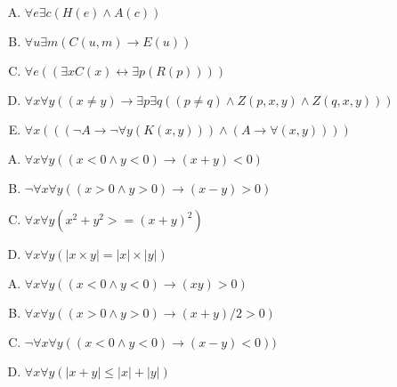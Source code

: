 {{        %
        \begin{practices}
            \begin{enumerate}[A.]
                \item $\forall e \exists c (H(e) \wedge A(c))$
                \item $\forall u \exists m (C(u, m) \rightarrow E(u))$
                \item $\forall e ((\exists x C(x) \leftrightarrow \exists p (R(p))))$
                \item $\forall x \forall y ((x \neq y) \rightarrow \exists p \exists q ((p \neq q) \wedge Z(p, x, y) \wedge Z(q, x, y)))$
                \item $\forall x (((\neg A \rightarrow \neg \forall y (K(x, y))) \wedge (A \rightarrow \forall (x, y))))$
            \end{enumerate}
        \end{practices}

        \begin{practices}
            \begin{enumerate}[A.]
                \item $\forall x \forall y ((x < 0 \wedge y < 0) \rightarrow (x + y) < 0)$
                \item $\neg \forall x \forall y ((x > 0 \wedge y > 0) \rightarrow (x - y) > 0)$
                \item $\forall x \forall y (x^2 + y^2 >= (x + y)^2)$
                \item $\forall x \forall y (|x \times y| = |x| \times |y|)$
            \end{enumerate}
        \end{practices}

        \begin{practices}
            \begin{enumerate}[A.]
                \item $\forall x \forall y ((x < 0 \wedge y < 0) \rightarrow (xy) > 0)$
                \item $\forall x \forall y ((x > 0 \wedge y > 0) \rightarrow (x + y) / 2 > 0)$
                \item $\neg \forall x \forall y ((x < 0 \wedge y < 0) \rightarrow (x - y) < 0))$
                \item $\forall x \forall y (|x + y| \leq |x| + |y|)$
            \end{enumerate}
        \end{practices}

}}
